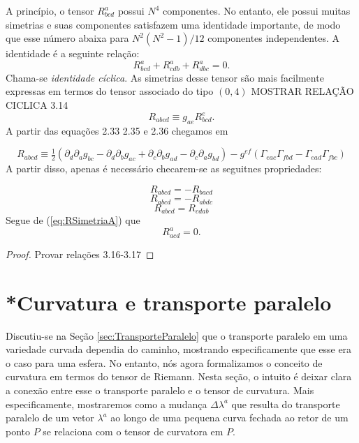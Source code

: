  A princípio, o tensor $R^a_{bcd}$ possui $N^4$ componentes. No entanto, ele possui muitas simetrias e suas componentes satisfazem uma identidade importante, de modo que esse número abaixa para $N^2(N^2-1)/12$ componentes independentes. A identidade é a seguinte relação:
 \begin{equation}\label{eq:IdentidadeCiclicaTensorDeCurvatura}
	 R^a_{bcd}+R^a_{cdb}+R^a_{dbc}=0.
 \end{equation}
 Chama-se \textit{identidade cíclica}. As simetrias desse tensor são mais facilmente expressas em termos do tensor associado do tipo $(0,4)$
 {\color{red} MOSTRAR RELAÇÃO CICLICA 3.14}
\[
	R_{abcd} \equiv g_{ae}R^e_{bcd}.
\]
{\color{red}
A partir das equações 2.33 2.35 e 2.36 chegamos em
}

\begin{equation}
	R_{a b c d} \equiv \tfrac{1}{2}\left(\partial_{d} \partial_{a} g_{b c}-\partial_{d} \partial_{b} g_{a c}+\partial_{c} \partial_{b} g_{a d}-\partial_{c} \partial_{a} g_{b d}\right)-g^{e f}\left(\Gamma_{e a c} \Gamma_{f b d}-\Gamma_{e a d} \Gamma_{f b c}\right)
\end{equation}
A partir disso, apenas é necessário checarem-se as seguitnes propriedades:

\begin{equation}\label{eq:RSimetriaA}
	R_{abcd}=-R_{bacd}
\end{equation}
\begin{equation}\label{eq:RSimetriaB}
	R_{abcd}=-R_{abdc}
\end{equation}
\begin{equation}\label{eq:RSimetriaC}
	R_{abcd}=R_{cdab}
\end{equation}
Segue de (\eqref{eq:RSimetriaA}) que
\[
R^a_{acd} = 0.
\]


\begin{proof}
	Provar relações 3.16-3.17
\end{proof}








\section{*Curvatura e transporte paralelo}\label{sec:CurvaturaTransporteParalelo}

Discutiu-se na Seção \ref{sec:TransporteParalelo} que o transporte paralelo em uma variedade curvada dependia do caminho, mostrando especificamente que esse era o caso para uma esfera. No entanto, nós agora formalizamos o conceito de curvatura em termos do tensor de Riemann. Nesta seção, o intuito é deixar clara a conexão entre esse o transporte paralelo e o tensor de curvatura. Mais especificamente, mostraremos como a mudança $\Delta\lambda^a$ que resulta do transporte paralelo de um vetor $\lambda^a$ ao longo de uma pequena curva fechada ao retor de um ponto $P$ se relaciona com o tensor de curvatora em $P$.


